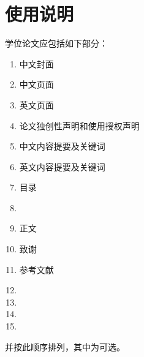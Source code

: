 ﻿\documentclass[figurelist,tablelist,algorithmlist,nomlist,masters]{seuthesix}
\begin{document}
\chapter{使用说明}
学位论文应包括如下部分：\\
\begin{enumerate}
\itshape
\item 中文封面
\item 中文页面
\item 英文页面
\item 论文独创性声明和使用授权声明
\item 中文内容提要及关键词
\item 英文内容提要及关键词
\item 目录
\item {}
\item 正文
\item 致谢
\item 参考文献
\item  {}
\item {}
\item  {}
\item {}
\end{enumerate}
并按此顺序排列，其中为可选。
\end{document}
